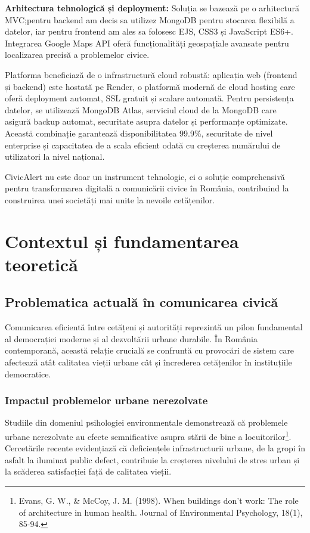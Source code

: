 \documentclass[12pt,a4paper]{report}
\begin{document}
\textbf{Arhitectura tehnologică și deployment:}
Soluția se bazează pe o arhitectură MVC;pentru backend am decis sa utilizez MongoDB pentru stocarea flexibilă a datelor, iar pentru frontend am ales sa folosesc  EJS, CSS3 și JavaScript ES6+. Integrarea Google Maps API oferă funcționalități geospațiale avansate pentru localizarea precisă a problemelor civice.

Platforma beneficiază de o infrastructură cloud robustă: aplicația web (frontend și backend) este hostată pe Render, o platformă modernă de cloud hosting care oferă deployment automat, SSL gratuit și scalare automată. Pentru persistența datelor, se utilizează MongoDB Atlas, serviciul cloud de la MongoDB care asigură backup automat, securitate asupra datelor și performanțe optimizate. Această combinație garantează disponibilitatea 99.9\%, securitate de nivel enterprise și capacitatea de a scala eficient odată cu creșterea numărului de utilizatori la nivel național.

CivicAlert nu este doar un instrument tehnologic, ci o soluție comprehensivă pentru transformarea digitală a comunicării civice în România, contribuind la construirea unei societăți mai unite la nevoile cetățenilor.


\newpage
\chapter{Contextul și fundamentarea teoretică}

\section{Problematica actuală în comunicarea civică}

Comunicarea eficientă între cetățeni și autorități reprezintă un pilon fundamental al democrației moderne și al dezvoltării urbane durabile. În România contemporană, această relație crucială se confruntă cu provocări de sistem care afectează atât calitatea vieții urbane cât și încrederea cetățenilor în instituțiile democratice.
\subsection{Impactul problemelor urbane nerezolvate}

Studiile din domeniul psihologiei environmentale demonstrează că problemele urbane nerezolvate au efecte semnificative asupra stării de bine a locuitorilor\footnote{Evans, G. W., \& McCoy, J. M. (1998). When buildings don't work: The role of architecture in human health. Journal of Environmental Psychology, 18(1), 85-94.}. Cercetările recente evidențiază că deficiențele infrastructurii urbane, de la gropi în asfalt la iluminat public defect, contribuie la creșterea nivelului de stres urban și la scăderea satisfacției față de calitatea vieții.
\end{document}
